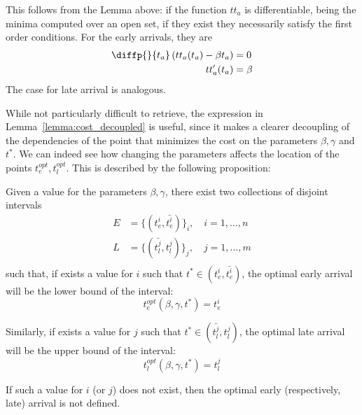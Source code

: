This follows from the Lemma above:
if the function \(tt_a\) is differentiable, being the minima computed over an open set,
if they exist they necessarily satisfy the first order conditions.
For the early arrivals, they are
\begin{align*}
  \diffp{}{{t_a}} \left(tt_a(t_a) - \beta t_a\right) & = 0 \\
  tt_a'(t_a) & = \beta
\end{align*}
The case for late arrival is analogous.

While not particularly difficult to retrieve,
the expression in Lemma~\ref{lemma:cost_decoupled} is useful,
since it makes a clearer decoupling of the dependencies of the point that minimizes the cost on the parameters \(\beta, \gamma\) and \(t^*\).
We can indeed see how changing the parameters affects the location of the points \(t_e^{opt}, t_l^{opt}\).
This is described by the following proposition:
\begin{prop}
  \label{prop:into-early-late}
  Given a value for the parameters \(\beta, \gamma\),
  there exist two collections of disjoint intervals
  \begin{align*}
    E & = \{(t_e^i, \bar{t_e^i})\}_i,\quad i = 1, \dots, n \\
    L & = \{(\bar{t_l^j}, t_l^j)\}_j,\quad j = 1, \dots, m \\
  \end{align*}
  such that, if exists a value for \(i\) such that \(t^* \in (t_e^i, \bar{t_e^i})\),
  the optimal early arrival will be the lower bound of the interval:
  \begin{equation*}
    t_e^{opt}(\beta, \gamma, t^*) = t_e^{i}
  \end{equation*}

  Similarly, if exists a value for \(j\) such that \(t^* \in (\bar{t_l^j}, t_l^j)\),
  the optimal late arrival will be the upper bound of the interval:
  \begin{equation*}
    t_l^{opt}(\beta, \gamma, t^*) = t_l^{j}
  \end{equation*}

  If such a value for \(i\) (or \(j\)) does not exist,
  then the optimal early (respectively, late) arrival is not defined.
\end{prop}

